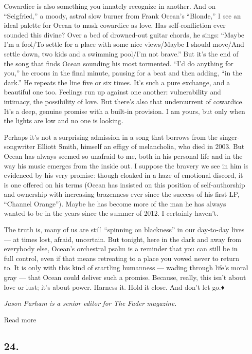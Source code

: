 Cowardice is also something you innately recognize in another. And on
``Seigfried,'' a moody, astral slow burner from Frank Ocean's
``Blonde,'' I see an ideal palette for Ocean to mask cowardice as love.
Has self-confliction ever sounded this divine? Over a bed of drowned-out
guitar chords, he sings: ``Maybe I'm a fool/To settle for a place with
some nice views/Maybe I should move/And settle down, two kids and a
swimming pool/I'm not brave.'' But it's the end of the song that finds
Ocean sounding his most tormented. ``I'd do anything for you,'' he
croons in the final minute, pausing for a beat and then adding, ``in the
dark.'' He repeats the line five or six times. It's such a pure
exchange, and a beautiful one too. Feelings run up against one another:
vulnerability and intimacy, the possibility of love. But there's also
that undercurrent of cowardice. It's a deep, genuine promise with a
built-in provision. I am yours, but only when the lights are low and no
one is looking.

Perhaps it's not a surprising admission in a song that borrows from the
singer-songwriter Elliott Smith, himself an effigy of melancholia, who
died in 2003. But Ocean has always seemed so unafraid to me, both in his
personal life and in the way his music emerges from the inside out. I
suppose the bravery we see in him is evidenced by his very promise:
though cloaked in a haze of emotional discord, it is one offered on his
terms (Ocean has insisted on this position of self-authorship and
ownership with increasing brazenness ever since the success of his first
LP, ``Channel Orange''). Maybe he has become more of the man he has
always wanted to be in the years since the summer of 2012. I certainly
haven't.

The truth is, many of us are still ``spinning on blackness'' in our
day-to-day lives --- at times lost, afraid, uncertain. But tonight, here
in the dark and away from everybody else, Ocean's orchestral psalm is a
reminder that you can still be in full control, even if that means
retreating to a place you vowed never to return to. It is only with this
kind of startling humanness --- wading through life's moral gray ---
that Ocean could deliver such a promise. Because, really, this isn't
about love or lust; it's about power. Harness it. Hold it close. And
don't let go.♦

\emph{Jason Parham is a senior editor for The Fader magazine.}

Read more

\hypertarget{24}{%
\subsection{24.}\label{24}}

